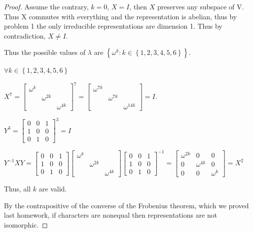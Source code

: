 \documentclass{article}
\begin{document}
\begin{proof}
    Assume the contrary, $k = 0$, $X = I$, then $X$ preserves any subspace of V. Thus X commutes with everything and the representation is abelian, thus by problem 1 the only irreducible representations are dimension 1. Thus by contradiction, $X \neq I$.
    
    Thus the possible values of $\lambda$ are $\left\{ \omega^k : k \in \left\{ 1, 2, 3, 4, 5, 6 \right\} \right\}$. 

    $\forall k \in \left\{1, 2, 3, 4, 5, 6 \right\}$
    
    $X^7 = \begin{bmatrix}
        \omega^k \\  & \omega^{2k} \\  & & \omega^{4k}
    \end{bmatrix}^7 = \begin{bmatrix}
        \omega^{7k} \\  & \omega^{7k} \\  & & \omega^{14k}
    \end{bmatrix} = I$.
    
    $Y^3 = \begin{bmatrix}
        0 & 0 & 1 \\ 1 & 0 & 0 \\  0 & 1 & 0
    \end{bmatrix}^3 = I
    $

    $Y^{-1}XY = \begin{bmatrix}
        0 & 0 & 1 \\ 1 & 0 & 0 \\  0 & 1 & 0
    \end{bmatrix}\begin{bmatrix}
        \omega^k \\  & \omega^{2k} \\  & & \omega^{4k}
    \end{bmatrix}\begin{bmatrix}
        0 & 0 & 1 \\ 1 & 0 & 0 \\  0 & 1 & 0
    \end{bmatrix}^{-1} = \begin{bmatrix}
        \omega^{2k} & 0 & 0 \\
        0 & \omega^{4k} & 0 \\
        0 & 0 & \omega^{k}
        \end{bmatrix} = X^2$
        
    Thus, all $k$ are valid.  

    By the contrapositive of the converse of the Frobenius theorem, which we proved last homework, if characters are nonequal then representations are not isomorphic. 
    

\end{proof}
\end{document}
